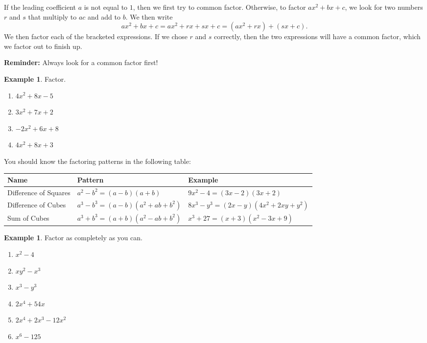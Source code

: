 \documentclass[letterpaper,12pt,oneside]{book}
\def\arraystretch{1.2}
\theoremstyle{definition}
\newtheorem{example}[theorem]{Example}
\begin{document}
\newpage

If the leading coefficient $a$ is not equal to $1$, then we first try to common factor.  Otherwise, to factor $ax^2+bx+c$, we look for two numbers $r$ and $s$ that multiply to $ac$ and add to $b$.  We then write
\[
ax^2+bx+c=ax^2+rx+sx+c=(ax^2+rx)+(sx+c).
\]
We then factor each of the bracketed expressions.  If we chose $r$ and $s$ correctly, then the two expressions will have a common factor, which we factor out to finish up.

\noindent
\textbf{Reminder:} Always look for a common factor first!

\begin{example}
Factor.
\begin{multicols}{2}
\begin{enumerate}
\item $4x^2+8x-5$
\vspace{2cm}
\item $3x^2+7x+2$
\vspace{2cm}
\vspace*{\fill}
\item $-2x^2+6x+8$
\vspace{2cm}
\item $4x^2+8x+3$
\vspace{2cm}
\vspace*{\fill}
\end{enumerate}
\end{multicols}
\end{example}

\noindent
You should know the factoring patterns in the following table:
\begin{center}
\def\arraystretch{1.2}
\begin{tabular}{l l l}
Name & Pattern & Example\\\hline
Difference of Squares & $a^2-b^2=(a-b)(a+b)$ & $9x^2-4=(3x-2)(3x+2)$\\
Difference of Cubes & $a^3-b^3=(a-b)(a^2+ab+b^2)$ & \footnotesize $8x^3-y^3=(2x-y)(4x^2+2xy+y^2)$\\
Sum of Cubes & $a^3+b^3=(a+b)(a^2-ab+b^2)$ & $x^3+27=(x+3)(x^2-3x+9)$
\end{tabular}
\end{center}
\begin{example}
Factor as completely as you can.
\begin{multicols*}{2}
\begin{enumerate}
\item $x^2-4$
\vfill\null
\item $xy^2-x^3$
\vfill\null
\item $x^3-y^3$
\vfill\null
\columnbreak
\item $2x^4+54x$
\vfill\null
\item $2x^4+2x^3-12x^2$
\vfill\null
\item $x^6-125$
\vfill\null
\end{enumerate}
\end{multicols*}
\end{example}
\end{document}
